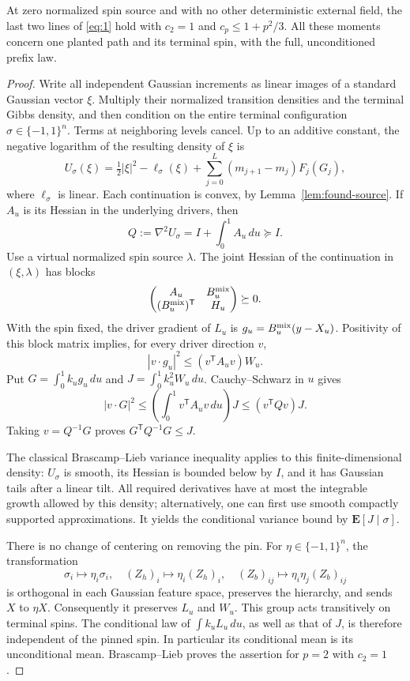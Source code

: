 \begin{lemma}\label{lem:found-moments}
At zero normalized spin source and with no other deterministic external
field, the last two lines of \eqref{eq:1} hold with $c_2=1$ and
$c_p\leq1+p^2/3$. All these moments concern one planted path and its
terminal spin, with the full, unconditioned prefix law.
\end{lemma}

\begin{proof}
Write all independent Gaussian increments as linear images of a standard
Gaussian vector $\xi$. Multiply their normalized transition densities
and the terminal Gibbs density, and then condition on the entire terminal
configuration $\sigma\in\{-1,1\}^n$.
Terms at neighboring levels cancel. Up to an additive constant, the
negative logarithm of the resulting density of $\xi$ is
\[
 U_\sigma(\xi)=\tfrac12|\xi|^2-\ell_\sigma(\xi)
                      +\sum_{j=0}^L(m_{j+1}-m_j)F_j(G_j),
\]
where $\ell_\sigma$ is linear. Each continuation is convex, by
Lemma~\ref{lem:found-source}. If $A_u$ is its Hessian in the underlying
drivers, then
\[
 Q:=\nabla^2U_\sigma=I+\int_0^1 A_u\,du\succeq I.
\]
Use a virtual normalized spin source $\lambda$. The joint Hessian of
the continuation in $(\xi,\lambda)$ has blocks
\[
 \begin{pmatrix}A_u&B_u^{\rm mix}\\
                 (B_u^{\rm mix})^{\mathsf T}&H_u\end{pmatrix}
 \succeq0.
\]
With the spin fixed, the driver gradient of $L_u$ is
$g_u=B_u^{\rm mix}(y-X_u)$. Positivity of this block matrix implies, for
every driver direction $v$,
\[
 |v\cdot g_u|^2\leq(v^{\mathsf T}A_uv)W_u.
\]
Put $G=\int_0^1k_ug_u\,du$ and $J=\int_0^1k_u^2W_u\,du$.
Cauchy--Schwarz in $u$ gives
\[
 |v\cdot G|^2\leq
   \left(\int_0^1v^{\mathsf T}A_uv\,du\right)J
   \leq(v^{\mathsf T}Qv)J.
\]
Taking $v=Q^{-1}G$ proves $G^{\mathsf T}Q^{-1}G\leq J$.

The classical Brascamp--Lieb variance inequality
\cite[Theorem~4.1]{BL1976} applies to
this finite-dimensional density: $U_\sigma$ is smooth, its Hessian is
bounded below by $I$, and it has Gaussian tails after a linear tilt.
All required derivatives have at most the integrable growth allowed by
this density; alternatively, one can first use smooth compactly supported
approximations. It yields the conditional variance bound by
$\mathbf E[J\mid\sigma]$.

There is no change of centering on removing the pin. For
$\eta\in\{-1,1\}^n$, the transformation
\[
 \sigma_i\mapsto\eta_i\sigma_i,\quad
 (Z_h)_i\mapsto\eta_i(Z_h)_i,\quad
 (Z_b)_{ij}\mapsto\eta_i\eta_j(Z_b)_{ij}
\]
is orthogonal in each Gaussian feature space, preserves the hierarchy,
and sends $X$ to $\eta X$. Consequently it preserves $L_u$ and $W_u$.
This group acts transitively on terminal spins. The conditional law of
$\int k_uL_u\,du$, as well as that of $J$, is therefore independent of the
pinned spin. In particular its conditional mean is its unconditional
mean. Brascamp--Lieb proves the assertion for $p=2$ with $c_2=1$.


\end{proof}
